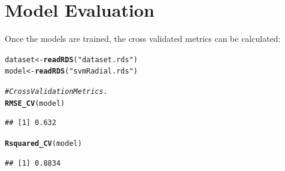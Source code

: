 \documentclass[twoside,a4wide,12pt]{article}\usepackage[]{graphicx}\usepackage[]{color}
\makeatletter
\newcommand{\hlstr}[1]{\textcolor[rgb]{0.192,0.494,0.8}{#1}}%
\newcommand{\hlcom}[1]{\textcolor[rgb]{0.678,0.584,0.686}{\textit{#1}}}%
\newcommand{\hlstd}[1]{\textcolor[rgb]{0.345,0.345,0.345}{#1}}%
\newcommand{\hlkwb}[1]{\textcolor[rgb]{0.69,0.353,0.396}{#1}}%
\newcommand{\hlkwd}[1]{\textcolor[rgb]{0.737,0.353,0.396}{\textbf{#1}}}%
\newenvironment{kframe}{%
 \def\at@end@of@kframe{}%
 \ifinner\ifhmode%
  \def\at@end@of@kframe{\end{minipage}}%
  \begin{minipage}{\columnwidth}%
 \fi\fi%
 \def\FrameCommand##1{\hskip\@totalleftmargin \hskip-\fboxsep
 \colorbox{shadecolor}{##1}\hskip-\fboxsep
     \hskip-\linewidth \hskip-\@totalleftmargin \hskip\columnwidth}%
 \MakeFramed {\advance\hsize-\width
   \@totalleftmargin\z@ \linewidth\hsize
   \@setminipage}}%
 {\par\unskip\endMakeFramed%
 \at@end@of@kframe}
\newenvironment{knitrout}{}{} %
\makeatother
\begin{document}
\section{Model Evaluation}

Once the models are trained, the cross validated metrics can be calculated:

\begin{knitrout}
\color{fgcolor}\begin{kframe}
\begin{alltt}
\hlstd{dataset} \hlkwb{<-} \hlkwd{readRDS}\hlstd{(}\hlstr{"dataset.rds"}\hlstd{)}
\hlstd{model} \hlkwb{<-} \hlkwd{readRDS}\hlstd{(}\hlstr{"svmRadial.rds"}\hlstd{)}

\hlcom{# Cross Validation Metrics.}
\hlkwd{RMSE_CV}\hlstd{(model)}
\end{alltt}
\begin{verbatim}
## [1] 0.632
\end{verbatim}
\begin{alltt}
\hlkwd{Rsquared_CV}\hlstd{(model)}
\end{alltt}
\begin{verbatim}
## [1] 0.8834
\end{verbatim}
\end{kframe}
\end{knitrout}
\end{document}
